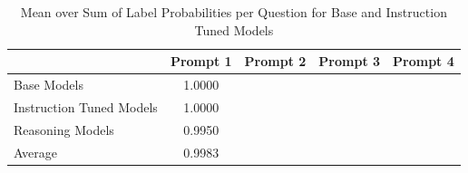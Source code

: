 
\begin{table}[h]
    \centering
    \begin{tabular}{lcccc}
        \toprule
        & Prompt 1 & Prompt 2 & Prompt 3 & Prompt 4 \\
        \midrule
        Base Models & 1.0000 \\
        Instruction Tuned Models & 1.0000 \\
        Reasoning Models & 0.9950 \\
        Average & 0.9983 \\
        \bottomrule
    \end{tabular}
    \caption{Mean over Sum of Label Probabilities per Question for Base and Instruction Tuned Models}
    \label{tab:labelprobsum}
\end{table}
